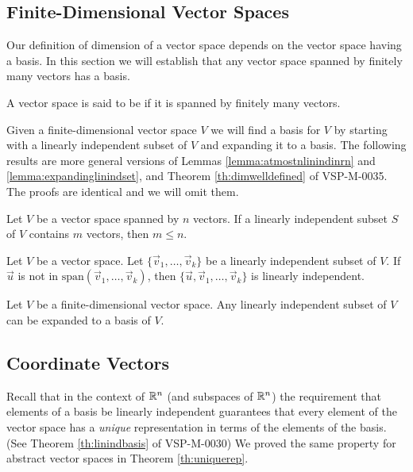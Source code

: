 \documentclass{ximera}
\begin{document}
\subsection*{Finite-Dimensional Vector Spaces}
Our definition of dimension of a vector space depends on the vector space having a basis.  In this section we will establish that any vector space spanned by finitely many vectors has a basis.

\begin{definition}
A vector space is said to be  if it is spanned by finitely many vectors.
\end{definition}

Given a finite-dimensional vector space $V$ we will find a basis for $V$ by starting with a linearly independent subset of $V$ and expanding it to a basis.  The following results are more general versions of Lemmas \ref{lemma:atmostnlinindinrn} and \ref{lemma:expandinglinindset}, and Theorem \ref{th:dimwelldefined} of VSP-M-0035.  The proofs are identical and we will omit them.
\begin{lemma}\label{lemma:atmostnlinindinabstract}
Let $V$ be a vector space spanned by $n$ vectors.  If a linearly independent subset $S$ of $V$ contains $m$ vectors, then $m\leq n$.
\end{lemma}

\begin{lemma}\label{lemma:expandinglinindsetabstract}
Let $V$ be a vector space.  Let $\{\vec{v}_1,\ldots ,\vec{v}_k\}$ be a linearly independent subset of $V$.  If $\vec{u}$ is not in $\mbox{span}(\vec{v}_1,\ldots ,\vec{v}_k)$, then $\{\vec{u},\vec{v}_1,\ldots ,\vec{v}_k\}$ is linearly independent.
\end{lemma}

\begin{theorem}\label{th:expandtobasisabstract}
Let $V$ be a finite-dimensional vector space.  Any linearly independent subset of $V$ can be expanded to a basis of $V$.
\end{theorem}

\subsection*{Coordinate Vectors}

Recall that in the context of $\mathbb{R}^n$ (and subspaces of $\mathbb{R}^n$) the requirement that elements of a basis be linearly independent guarantees that every element of the vector space has a {\it unique} representation in terms of the elements of the basis.  (See Theorem \ref{th:linindbasis} of VSP-M-0030)  We proved the same property for abstract vector spaces in Theorem \ref{th:uniquerep}.
\end{document}
